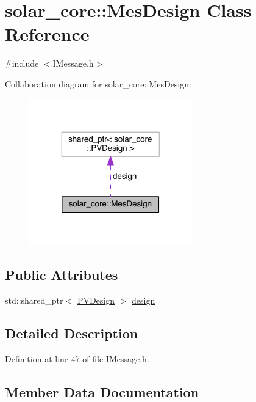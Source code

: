 \hypertarget{classsolar__core_1_1_mes_design}{}\section{solar\+\_\+core\+:\+:Mes\+Design Class Reference}
\label{classsolar__core_1_1_mes_design}


{\ttfamily \#include $<$I\+Message.\+h$>$}



Collaboration diagram for solar\+\_\+core\+:\+:Mes\+Design\+:
\nopagebreak
\begin{figure}[H]
\begin{center}
\leavevmode
\includegraphics[width=200pt]{classsolar__core_1_1_mes_design__coll__graph}
\end{center}
\end{figure}
\subsection*{Public Attributes}
\begin{DoxyCompactItemize}
\item 
std\+::shared\+\_\+ptr$<$ \hyperlink{classsolar__core_1_1_p_v_design}{P\+V\+Design} $>$ \hyperlink{classsolar__core_1_1_mes_design_a85bd3d4d32c763ac3f9c6547ab4002ab}{design}
\end{DoxyCompactItemize}


\subsection{Detailed Description}


Definition at line 47 of file I\+Message.\+h.



\subsection{Member Data Documentation}
\hypertarget{classsolar__core_1_1_mes_design_a85bd3d4d32c763ac3f9c6547ab4002ab}{}
